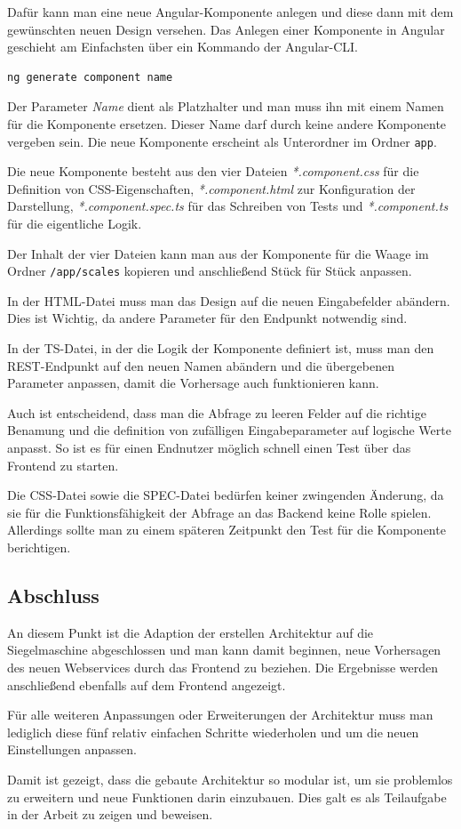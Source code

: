 Dafür kann man eine neue Angular-Komponente anlegen und diese dann mit dem gewünschten neuen Design versehen. Das
Anlegen einer Komponente in Angular geschieht am Einfachsten über ein Kommando der Angular-CLI.

\begin{lstlisting}[caption=Erstellen einer neuen Komponente, label=ls:schlauchbeutelmaschine_component]
    ng generate component name
\end{lstlisting}

Der Parameter \textit{Name} dient als Platzhalter und man muss ihn mit einem Namen für die Komponente ersetzen. Dieser
Name darf durch keine andere Komponente vergeben sein. Die neue Komponente erscheint als Unterordner im Ordner
\texttt{app}.

Die neue Komponente besteht aus den vier Dateien \textit{*.component.css} für die Definition von CSS-Eigenschaften,
\textit{*.component.html} zur Konfiguration der Darstellung, \textit{*.component.spec.ts} für das Schreiben von Tests
und \textit{*.component.ts} für die eigentliche Logik.

Der Inhalt der vier Dateien kann man aus der Komponente für die Waage im Ordner \texttt{/app/scales} kopieren und
anschließend Stück für Stück anpassen.

In der HTML-Datei muss man das Design auf die neuen Eingabefelder abändern. Dies ist Wichtig, da andere Parameter für
den Endpunkt notwendig sind.

In der TS-Datei, in der die Logik der Komponente definiert ist, muss man den REST-Endpunkt auf den neuen Namen abändern
und die übergebenen Parameter anpassen, damit die Vorhersage auch funktionieren kann.

Auch ist entscheidend, dass man die Abfrage zu leeren Felder auf die richtige Benamung und die definition von
zufälligen Eingabeparameter auf logische Werte anpasst. So ist es für einen Endnutzer möglich schnell einen Test über
das Frontend zu starten.

Die CSS-Datei sowie die SPEC-Datei bedürfen keiner zwingenden Änderung, da sie für die Funktionsfähigkeit der Abfrage an
das Backend keine Rolle spielen. Allerdings sollte man zu einem späteren Zeitpunkt den Test für die Komponente
berichtigen.

\subsection{Abschluss}
An diesem Punkt ist die Adaption der erstellen Architektur auf die Siegelmaschine abgeschlossen und man kann damit
beginnen, neue Vorhersagen des neuen Webservices durch das Frontend zu beziehen. Die Ergebnisse werden anschließend
ebenfalls auf dem Frontend angezeigt.

Für alle weiteren Anpassungen oder Erweiterungen der Architektur muss man lediglich diese fünf relativ einfachen
Schritte wiederholen und um die neuen Einstellungen anpassen.

Damit ist gezeigt, dass die gebaute Architektur so modular ist, um sie problemlos zu erweitern und neue Funktionen
darin einzubauen. Dies galt es als Teilaufgabe in der Arbeit zu zeigen und beweisen.